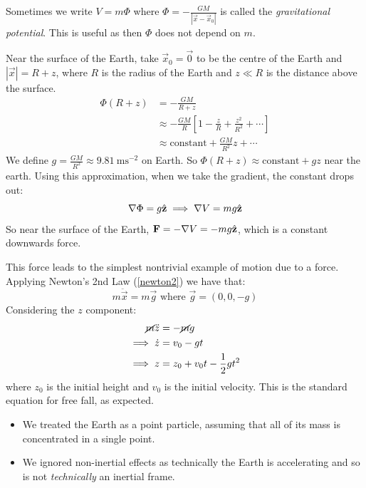 \documentclass[../main.tex]{subfiles}
\begin{document}
Sometimes we write $V = m \Phi$ where $\Phi = -\frac{GM}{|\vec{x} - \vec{x}_0|}$ is called the \textit{gravitational potential}.
This is useful as then $\Phi$ does not depend on $m$.

Near the surface of the Earth, take $\vec{x}_0 = \vec{0}$ to be the centre of the Earth and $|\vec{x}| = R + z$, where $R$ is the radius of the Earth and $z \ll R$ is the distance above the surface.
\begin{align*}
  \Phi(R + z) &= - \frac{GM}{R + z} \\
              &\approx -\frac{GM}{R}\left[1 - \frac{z}{R} + \frac{z^2}{R^2} + \cdots\right] \\
              &\approx \text{constant} + \frac{GM}{R^2} z + \cdots
\end{align*}
We define $g = \frac{GM}{R^2} \approx \qty{9.81}{\metre\second^{-2}}$ on Earth.
So $\Phi(R + z) \approx \text{constant} + gz$ near the earth.
Using this approximation, when we take the gradient, the constant drops out:
\begin{equation}
  \nabla \Phi = g\hat{\mathbf{\bm{z}}} \implies \nabla V = mg\hat{\mathbf{\bm{z}}} \label{uniformGravitationalPot}
\end{equation}
So near the surface of the Earth, $\mathbf{\bm{F}} = -\nabla V = -mg\hat{\mathbf{\bm{z}}}$, which is a constant downwards force.

This force leads to the simplest nontrivial example of motion due to a force.
Applying Newton's 2nd Law (\cref{newton2}) we have that:
\[
  m \ddot{\vec{x}} = m \vec{g} \text{ where } \vec{g} = (0, 0, -g)
\]
Considering the $z$ component:
\begin{align*}
  \cancel{m} \ddot{z} &= - \cancel{m}g \\
  \implies \dot{z} &= v_0 - gt \\
  \implies z &= z_0 + v_0 t - \frac{1}{2}gt^2
\end{align*}
where $z_0$ is the initial height and $v_0$ is the initial velocity.
This is the standard equation for free fall, as expected.
\begin{remark}[Assumptions]
  \begin{itemize}
    \item We treated the Earth as a point particle, assuming that all of its mass is concentrated in a single point.
    \item We ignored non-inertial effects as technically the Earth is accelerating and so is not \textit{technically} an inertial frame.
  \end{itemize}
\end{remark}
\end{document}
